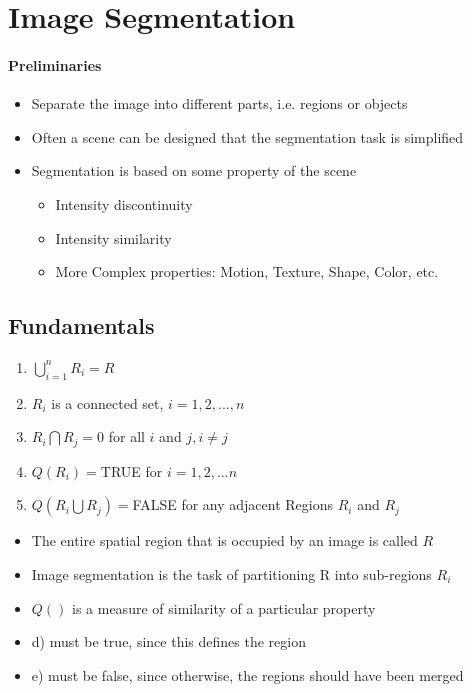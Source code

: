 \section{Image Segmentation}
\paragraph{Preliminaries}
\begin{itemize}
\item Separate the image into different parts, i.e. regions or objects
\item Often a scene can be designed that the segmentation task is simplified
\item Segmentation is based on some property of the scene
\begin{itemize}
\item Intensity discontinuity
\item Intensity similarity
\item More Complex properties: Motion, Texture, Shape, Color, etc.
\end{itemize}
\end{itemize}

\subsection{Fundamentals}
\begin{multicols}{2}
\begin{enumerate}[label={\alph*)}]
\item $\bigcup\limits_{i=1}^{n}R_i=R$
\item $R_i$ is a connected set, $i=1,2,...,n$
\item $R_i\bigcap R_j = 0$ for all $i$ and $j, i\neq j$
\item $Q(R_i)=$TRUE for $i=1,2,...n$
\item $Q(R_i\bigcup R_j)=$FALSE for any adjacent Regions $R_i$ and $R_j$
\end{enumerate}
\vfill
\columnbreak
\begin{itemize}
\item The entire spatial region that is occupied by an image is called $R$
\item Image segmentation is the task of partitioning R into sub-regions $R_i$
\item $Q()$ is a measure of similarity of a particular property
\item d) must be true, since this defines the region
\item e) must be false, since otherwise, the regions should have been merged
\end{itemize}
\end{multicols}

